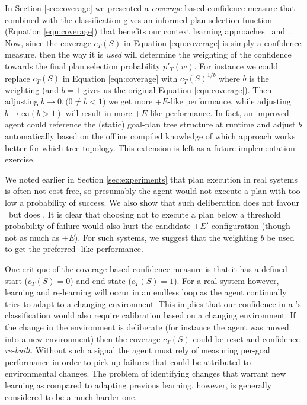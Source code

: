 In Section \ref{sec:coverage} we presented a \textit{coverage}-based confidence measure that combined with the \dt classification gives an informed plan selection function (Equation \ref{eqn:coverage}) that benefits our context learning approaches \CL\ and \BUL. Now, since the coverage $c_T(S)$ in Equation \ref{eqn:coverage} is simply a confidence measure, then the way it is \textit{used} will determine the weighting of the confidence towards the final plan selection probability $p'_T(w)$. For instance we could replace $c_T(S)$ in Equation \ref{eqn:coverage} with $c_T(S)^{1/b}$ where $b$ is the weighting (and $b=1$ gives us the original Equation \ref{eqn:coverage}). Then adjusting $b \rightarrow 0, (0 \ne b < 1$) we get more \BUL+$E$-like performance, while adjusting $b \rightarrow \infty (b > 1)$ will result in more \CL+$E$-like performance. In fact, an improved agent could reference the (static) goal-plan tree structure at runtime and adjust $b$ automatically based on the offline compiled knowledge of which approach works better for which tree topology. This extension is left as a future implementation exercise.

We noted earlier in Section \ref{sec:experiments} that plan execution in real systems is often not cost-free, so presumably the agent would not execute a plan with too low a probability of success. We also show that such deliberation does not favour \CL\ but does \BUL. It is clear that choosing not to execute a plan below a threshold probability of failure would also hurt the candidate \CL+$E'$ configuration (though not as much as \CL+$E$). For such systems, we suggest that the weighting $b$ be used to get the preferred \BUL-like performance.

One critique of the coverage-based confidence measure is that it has a defined start ($c_T(S)=0$) and end state ($c_T(S)=1$). For a real system however, learning and re-learning will occur in an endless loop as the agent continually tries to adapt to a changing environment. This implies that our confidence in a \dt's classification would also require calibration based on a changing environment. If the change in the environment is deliberate (for instance the agent was moved into a new environment) then the coverage $c_T(S)$ could be reset and confidence \textit{re-built}. Without such a signal the agent must rely of measuring per-goal performance in order to pick up failures that could be attributed to environmental changes. The problem of identifying changes that warrant new learning as compared to adapting previous learning, however, is generally considered to be a much harder one.

